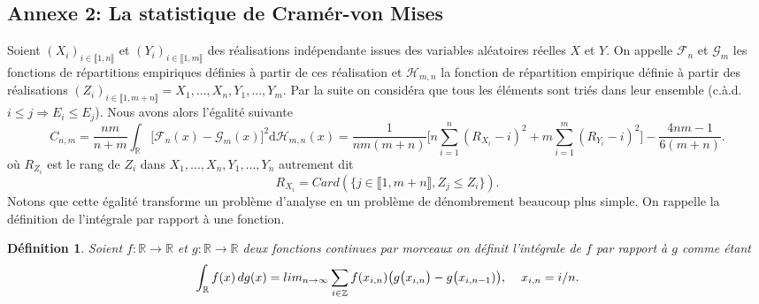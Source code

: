\documentclass[a4paper,11pt]{article}
\numberwithin{equation}{section}
\newtheorem{definition}{Définition}
\begin{document}
\subsection{Annexe 2: La statistique de Cramér-von Mises}
\label{lemme Cramer-von Mise}
Soient $(X_i)_{i\in \llbracket 1,n \rrbracket}$ et $(Y_i)_{i\in \llbracket 1,m \rrbracket }$ des réalisations indépendante issues des variables aléatoires réelles $X$ et $Y$. On appelle $\mathcal{F}_{n}$ et $\mathcal{G}_{m}$ les fonctions de répartitions empiriques définies à partir de ces réalisation et $\mathcal{H}_{m,n}$ la fonction de répartition empirique définie à partir des réalisations $(Z_i)_{i\in \llbracket 1,m+n \rrbracket }=X_1,...,X_n,Y_1,...,Y_m$. Par la suite on considéra que tous les éléments sont triés dans leur ensemble (c.à.d. $i\leq j \Rightarrow E_i\leq E_j$). Nous avons alors l'égalité suivante
\begin{equation}
	C_{n,m}=\frac{nm}{n+m}\int_{\mathbb{R}}\big[ \mathcal{F}_{n}(x)-\mathcal{G}_{m}(x)\big]^{2} \mathrm{d} \mathcal{H}_{m,n}(x)=\frac{1}{nm(m+n)}\Big[ n\sum_{i=1}^{n}(R_{X_i}-i)^2+ m\sum_{i=1}^{m}(R_{Y_i}-i)^2\Big]-\frac{4nm-1}{6(m+n)}.
\end{equation}
où $R_{Z_i}$ est le rang de $Z_i$ dans $X_1,...,X_n,Y_1,...,Y_n$ autrement dit 
\[R_{X_i}=Card(\{j \in \llbracket 1,m+n \rrbracket , Z_j\leq Z_i\}).\] 
Notons que cette égalité transforme un problème d'analyse en un problème de dénombrement beaucoup plus simple. On rappelle la définition de l'intégrale par rapport à une fonction.
\begin{definition}
	Soient $f:\mathbb{R} \to \mathbb{R}$ et $g:\mathbb{R} \to \mathbb{R}$ deux fonctions continues par morceaux on définit l'intégrale de $f$ par rapport à $g$ comme étant
	\[\int_{\mathbb{R}}f(x)\, dg(x)=lim_{n\to\infty}\sum_{i \in \mathbb{Z}}f(x_{i,n})\big( g\big(x_{i,n}\big)-g\big(x_{i,n-1})\big),\hspace{4mm}x_{i,n}=i/n.\]
\end{definition}
\end{document}
